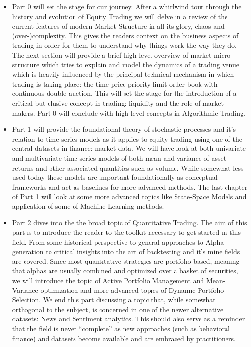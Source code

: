 \begin{itemize}
\item Part 0 will set the stage for our journey. After a whirlwind tour through the history and evolution of Equity Trading we will delve in a review of the current features of modern Market Structure in all its glory, chaos and (over-)complexity. This gives the readers context on the business aspects of trading in order for them to understand why things work the way they do. The next section will provide a brief high level overview of market micro-structure which tries to explain and model the dynamics of a trading venue which is heavily influenced by the principal technical mechanism in which trading is taking place: the time-price priority limit order book with  continuous double auction. This will set the stage for the introduction of a critical but elusive concept in trading: liquidity and the role of market makers. Part 0 will conclude with high level concepts in Algorithmic Trading.

\item Part 1 will provide the foundational theory of stochastic processes and it's relation to time series models as it applies to equity trading using one of the central datasets in finance: market data. We will have look at both univariate and multivariate time series models of both mean and variance of asset returns and other associated quantities such as volume. While somewhat less used today these models are important foundationally as conceptual frameworks and act as baselines for more advanced methods. The last chapter of Part 1 will look at some more advanced topics like State-Space Models and application of some of Machine Learning methods.

\item Part 2 dives into the the broad topic of Quantitative Trading. The aim of this part is to introduce the reader to the toolkit necessary to get started in this field. From some historical perspective to general approaches to Alpha generation to critical insights into the art of backtesting and it's mine fields are covered. Since most quantitative strategies are portfolio based, meaning that alphas are usually  combined  and optimized over a basket of securities, we will introduce the topic of Active Portfolio Management and Mean-Variance optimization and more advanced topics of Dynamic Portfolio Selection. We end this part discussing a topic that, while somewhat orthogonal to the subject, is concerned in one of the newer alternative datasets: News and Sentiment analytics. This should also serve as a reminder that the field is never ``complete'' as new approaches (such as behavioral finance) and datasets become available and are embraced by practitioners.


\end{itemize}
